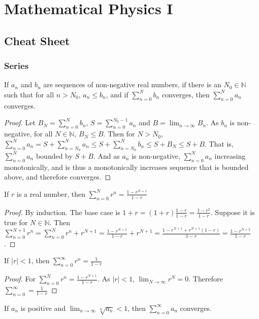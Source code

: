 \documentclass[crop=false,class=book,oneside]{standalone}
\begin{document}
\chapter{Mathematical Physics I}
\section{Cheat Sheet}
\subsection{Series}
\begin{theorem*}
If $a_n$ and $b_n$ are sequences of non-negative real numbers, if there is an $N_0\in \mathbb{N}$ such that for all $n>N_0$, $a_n\leq b_n$, and if $\sum_{n=0}^{N}b_n$ converges, then $\sum_{n=0}^{N}a_n$ converges.
\end{theorem*}
\begin{proof}
Let $B_N=\sum_{n=0}^{N}b_n$, $S = \sum_{n=0}^{N_{0}-1}a_n$ and $B=\lim_{n\rightarrow \infty}B_{n}$. As $b_n$ is non-negative, for all $N\in \mathbb{N}$, $B_{N} \leq B$. Then for $N>N_{0}$, $\sum_{n=0}^{N}a_n = S+\sum_{n=N_{0}}^{N}a_n \leq S+\sum_{n=N_{0}}^{N}b_n \leq S+B_{N} \leq S+B$. That is, $\sum_{n=0}^{N}a_n$ bounded by $S+B$. And as $a_n$ is non-negative, $\sum_{n=0}^{N}a_n$ increasing monotonically, and is thus a monotonically increases sequence that is bounded above, and therefore converges.
\end{proof}
\begin{theorem*}
If $r$ is a real number, then $\sum_{n=0}^{N} r^n = \frac{1-r^{N+1}}{1-r}$
\end{theorem*}
\begin{proof}
By induction. The base case is $1+r = (1+r)\frac{1-r}{1-r} = \frac{1-r^2}{1-r}$. Suppose it is true for $N \in \mathbb{N}$. Then $\sum_{n=0}^{N+1}r^n=\sum_{n=0}^{N}r^n+r^{N+1}= \frac{1-r^{N+1}}{1-r}+r^{N+1}=\frac{1-r^{N+1}+r^{N+1}(1-r)}{1-r}=\frac{1-r^{N+2}}{1-r}$.
\end{proof}
\begin{theorem}
If $|r|<1$, then $\sum_{n=0}^{\infty} r^n = \frac{1}{1-r}$
\end{theorem}
\begin{proof}
For $\sum_{n=0}^{N}r^{n}=\frac{1-r^{N+1}}{1-r}$. As $|r|<1$, $\lim_{N\rightarrow \infty}r^{N}=0$. Therefore $\sum_{n=0}^{\infty}=\frac{1}{1-r}$
\end{proof}
\begin{theorem*}
If $a_n$ is positive and $\lim_{n\rightarrow \infty} \sqrt[n]{a_n}<1$, then $\sum_{n=0}^{\infty} a_n$ converges.
\end{theorem*}
\end{document}

